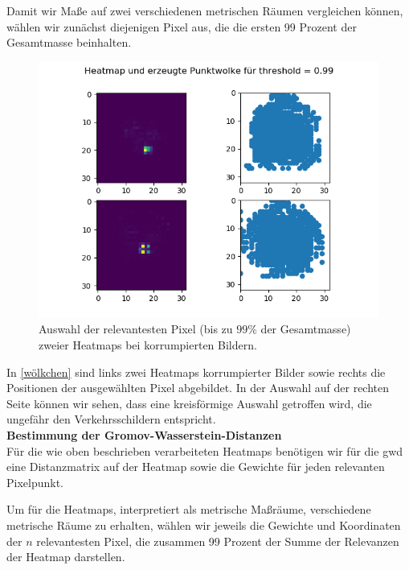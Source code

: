 \documentclass[twoside, 12pt,a4paper]{book}
\numberwithin{equation}{section}
\begin{document}
	
	
	
	\noindent Damit wir Maße auf zwei verschiedenen metrischen Räumen vergleichen können, wählen wir zunächst diejenigen Pixel aus, die die ersten 99 Prozent der Gesamtmasse beinhalten.\\
	
	\begin{figure}[h]
		
		\begin{center}
			\includegraphics[width=0.5\textheight]{HeatmapPunktwolke99.png}
			
		\end{center}
		\caption{Auswahl der relevantesten Pixel (bis zu $99\%$ der Gesamtmasse) zweier Heatmaps bei korrumpierten Bildern.}
		\label{wölkchen}
	\end{figure}
	
	\noindent In \autoref{wölkchen} sind links zwei Heatmaps korrumpierter Bilder sowie rechts die Positionen der ausgewählten Pixel abgebildet. In der Auswahl auf der rechten Seite können wir sehen, dass eine kreisförmige Auswahl getroffen wird, die ungefähr den Verkehrsschildern entspricht.\\
	
	
	
	\noindent\textbf{Bestimmung der Gromov-Wasserstein-Distanzen}\\
	Für die wie oben beschrieben verarbeiteten Heatmaps benötigen wir für die \ac{gwd} eine Distanzmatrix auf der Heatmap sowie die Gewichte für jeden relevanten Pixelpunkt.
	
	\noindent Um für die Heatmaps, interpretiert als metrische Maßräume, verschiedene metrische Räume zu erhalten, wählen wir jeweils die Gewichte und Koordinaten der $n$ relevantesten Pixel, die zusammen 99 Prozent der Summe der Relevanzen der Heatmap darstellen. 
	
\end{document}
